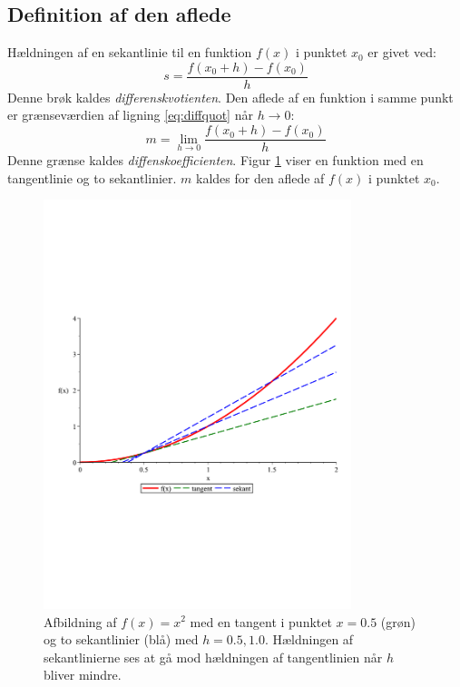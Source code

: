 \documentclass[a4paper, 11pt]{article}
\begin{document}
\subsection{Definition af den aflede}
Hældningen af en sekantlinie til en funktion $f(x)$ i punktet $x_0$ er givet ved:
\begin{equation} \label{eq:diffquot}
s = \frac{f(x_0+h) - f(x_0)}{h}
\end{equation}
Denne brøk kaldes \emph{differenskvotienten}. Den aflede af en funktion i samme punkt er grænseværdien af ligning \eqref{eq:diffquot} når $h\to0$:
\begin{equation} \label{eq:diffcoef}
m = \lim_{h\to0}\frac{f(x_0+h) - f(x_0)}{h}
\end{equation}
Denne grænse kaldes \emph{diffenskoefficienten}.  Figur \ref{fig:secanttangent} viser en funktion med en tangentlinie og to sekantlinier. $m$ kaldes for den aflede af $f(x)$ i punktet $x_0$. 
\begin{figure}[t]
	\centering
	\includegraphics[width=0.8\textwidth, clip, trim=0 7.8cm 0 6cm]{secant}
	\caption{Afbildning af $f(x)=x^2$ med en tangent i punktet $x=0.5$ (grøn) og to sekantlinier (blå) med $h=0.5, 1.0$. Hældningen af sekantlinierne ses at gå mod hældningen af tangentlinien når $h$ bliver mindre.}
	\label{fig:secanttangent}
\end{figure}
\end{document}

